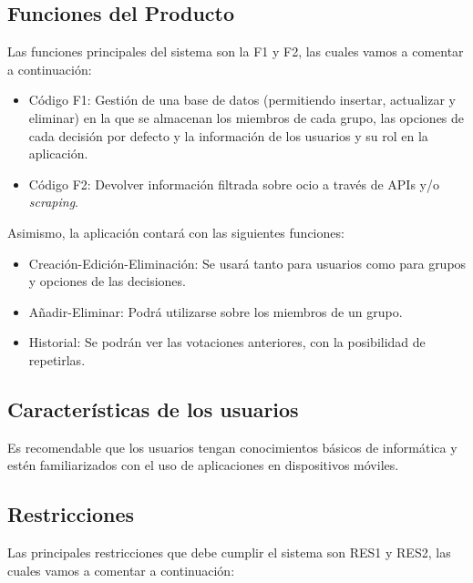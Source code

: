 \subsection{Funciones del Producto}

Las funciones principales del sistema son la F1 y F2, las cuales vamos a comentar a continuación:

\begin{itemize}
    \item Código F1: Gestión de una base de datos (permitiendo insertar, actualizar y eliminar) en la que se almacenan los miembros de cada grupo, las opciones de cada decisión por defecto y la información de los usuarios y su rol en la aplicación.
    \item Código F2: Devolver información filtrada sobre ocio a través de APIs y/o \textit{scraping}.
\end{itemize}

Asimismo, la aplicación contará con las siguientes funciones:

\begin{itemize}
    \item Creación-Edición-Eliminación: Se usará tanto para usuarios como para grupos y opciones de las decisiones. 
    \item Añadir-Eliminar: Podrá utilizarse sobre los miembros de un grupo.
    \item Historial: Se podrán ver las votaciones anteriores, con la posibilidad de repetirlas.
\end{itemize}


\subsection{Características de los usuarios}

Es recomendable que los usuarios tengan conocimientos básicos de informática y estén familiarizados con el uso de aplicaciones en dispositivos móviles.

\subsection{Restricciones}

Las principales restricciones que debe cumplir el sistema son RES1 y RES2, las cuales vamos a comentar a continuación:

